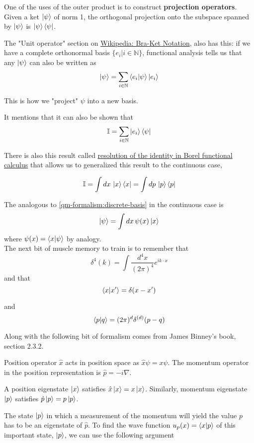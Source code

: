 One of the uses of the outer product is to construct \textbf{projection operators}. Given a ket $\ket{\psi}$
of norm 1, the orthogonal projection onto the subspace spanned by $\ket{\psi}$ is $\ket{\psi}\bra{\psi}$.


The "Unit operator" section on \href{https://en.wikipedia.org/wiki/Bra%E2%80%93ket_notation}{Wikipedia: Bra-Ket Notation},
also has this: if we have a complete orthonormal basis $\{ e_i | i\in\mathbb{N} \}$,
functional analysis tells us that any $\ket{\psi}$ can also be written as
\begin{equation}
\ket{\psi} =
\sum_{i\in\mathbb{N}} \braket{e_i | \psi} \ket{e_i} \label{qm-formalism:discrete-basis}
\end{equation}

This is how we "project" $\psi$ into a new basis.

It mentions that it can also be shown that
$$
\mathbb{I} = \sum_{i\in\mathbb{N}} \ket{e_i} \bra{\psi}
$$

There is also this result called
\href{https://en.wikipedia.org/wiki/Borel_functional_calculus#Resolution_of_the_identity}{resolution of the identity in Borel functional calculus}
that allows us to generalized this result to the continuous case,

$$
\mathbb{I} = \int dx \, \ket{x} \bra{x} = \int dp \, \ket{p} \bra{p}
$$


The analogous to \ref{qm-formalism:discrete-basis} in the continuous case is
$$
\ket{\psi} = \int dx\, \psi(x) \ket{x}
$$
where $\psi (x) = \braket{x | \psi}$ by analogy.
\\


The next bit of muscle memory to train is to remember that
$$
\delta^{4} (k) = \int \frac{d^4x}{(2\pi)^4} e^{ik\cdot x}
$$
and that
$$
\braket{x | x^\prime} = \delta(x - x^\prime)
$$

and
$$
\braket{p | q} = (2\pi)^d \delta^{(d)}(p - q)
$$

Along with the following bit of formalism comes from James Binney's book, section 2.3.2.

Position operator $\hat{x}$ acts in position space as $\hat{x} \psi = x\psi$.
The momentum operator in the position representation is $\hat{p} = -i\nabla$.

A position eigenstate $\ket{x}$ satisfies $\hat{x}\ket{x} = x\ket{x}$.
Similarly, momentum eigenstate $\ket{p}$ satisfies $\hat{p}\ket{p} = p\ket{p}$.

The state $\ket{p}$ in which a measurement of the momentum will yield the value $p$ has to be an eigenstate
of $\hat{p}$.
To find the wave function $u_p (x) = \braket{x | p}$ of this important state, $\ket{p}$,
we can use the following argument

